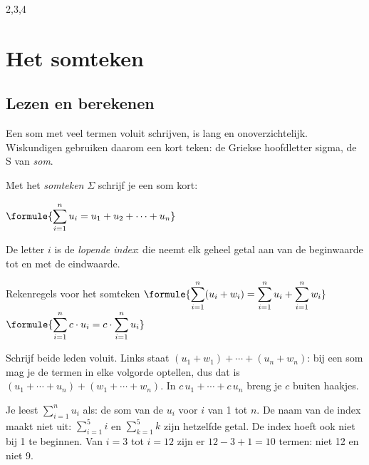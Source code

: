 
\begin{oefeningen}
\end{oefeningen}

\begin{alleenvoor}{2,3,4}
\section{Het somteken}

\subsection{Lezen en berekenen}

Een som met veel termen voluit schrijven, is lang en onoverzichtelijk. Wiskundigen gebruiken daarom een kort teken: de Griekse hoofdletter sigma, de S van \textit{som}.

\begin{theorie}
Met het \emph{somteken} $\Sigma$ schrijf je een som kort:

\qquad $\formule{\displaystyle\sum_{i=1}^{n} u_i = u_1 + u_2 + \cdots + u_n}$

\vspace{1mm}
De letter $i$ is de \emph{lopende index}: die neemt elk geheel getal aan van de beginwaarde tot en met de eindwaarde.

\begin{stelling}{Rekenregels voor het somteken}
\qquad $\formule{\displaystyle\sum_{i=1}^{n} (u_i + w_i) = \sum_{i=1}^{n} u_i + \sum_{i=1}^{n} w_i}$ \qquad\qquad $\formule{\displaystyle\sum_{i=1}^{n} c \cdot u_i = c \cdot \sum_{i=1}^{n} u_i}$
\end{stelling}

\begin{bewijs}
Schrijf beide leden voluit. Links staat $(u_1 + w_1) + \cdots + (u_n + w_n)$: bij een som mag je de termen in elke volgorde optellen, dus dat is $(u_1 + \cdots + u_n) + (w_1 + \cdots + w_n)$. In $c\,u_1 + \cdots + c\,u_n$ breng je $c$ buiten haakjes.
\end{bewijs}
\end{theorie}

Je leest $\sum_{i=1}^{n} u_i$ als: de som van de $u_i$ voor $i$ van 1 tot $n$. De naam van de index maakt niet uit: $\sum_{i=1}^{5} i$ en $\sum_{k=1}^{5} k$ zijn hetzelfde getal. De index hoeft ook niet bij 1 te beginnen. Van $i = 3$ tot $i = 12$ zijn er $12 - 3 + 1 = 10$ termen: niet 12 en niet 9.


\end{alleenvoor}
